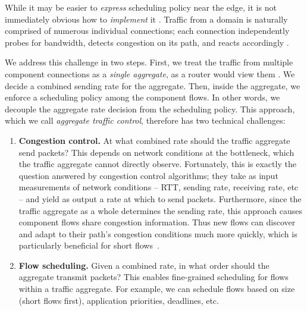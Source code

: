 {While it may be easier to \emph{express} scheduling policy near the edge, it is not immediately obvious how to \emph{implement} it . 
Traffic from a domain is naturally comprised of numerous individual connections;
each connection independently probes for bandwidth, detects congestion on its path, and reacts accordingly .


We address this challenge in two steps. 
First, we treat the traffic from multiple component connections as a \emph{single aggregate}, \ie as a router would view them . We decide a combined sending rate for the aggregate. Then, inside the aggregate, we enforce a scheduling policy among the component flows. 
In other words, we decouple the aggregate rate decision from the scheduling policy.
This approach, which we call {\em aggregate traffic control}, therefore has two technical challenges:
\begin{enumerate}
    \item {\bf Congestion control.} At what combined rate should the traffic aggregate send packets? This depends on network conditions at the bottleneck, which the traffic aggregate cannot directly observe.
    Fortunately, this is exactly the question answered by congestion control algorithms; they take as input measurements of network conditions -- RTT, sending rate, receiving rate, etc -- and yield as output a rate at which to send packets.
    Furthermore, since the traffic aggregate as a whole determines the sending rate, this approach causes component flows share congestion information.
    Thus new flows can discover and adapt to their path's congestion conditions much more quickly, which is particularly beneficial for short flows~\cite{CM}. 
    
    \item {\bf Flow scheduling.} Given a combined rate, in what order should the aggregate transmit packets?  This enables fine-grained scheduling for flows within a traffic aggregate. 
    For example, we can schedule flows based on size (short flows first), application priorities, deadlines, etc.
\end{enumerate}

}
